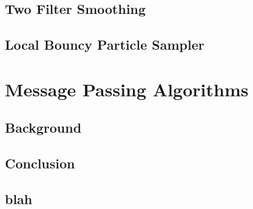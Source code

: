 \section{}

\chapter{Two Filter Smoothing}

\chapter{Local Bouncy Particle Sampler}


\part{Message Passing Algorithms} %

\chapter{Background}

\section{}


\newpage
\chapter{Conclusion}


\appendix{}

\chapter{blah}


\newpage
\renewcommand{\bibname}{References}

\begin{footnotesize}

\end{footnotesize}

